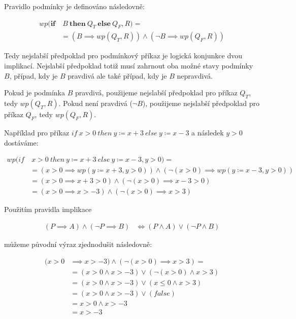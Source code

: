 Pravidlo podmínky je definováno následovně:

\begin{align*}
    wp(\textbf{if} & \ B \ \textbf{then} \ Q_T \ \textbf{else} \ Q_F, R) = \\
                   & = (B \implies wp(Q_T, R)) \land (\neg B \implies wp(Q_F, R))
\end{align*}

Tedy nejslabší předpoklad pro podmínkový příkaz je logická konjunkce dvou implikací.
Nejslabší předpoklad totiž musí zahrnout oba možné stavy podmínky $B$, případ, kdy je $B$ pravdivá ale také případ, kdy je $B$ nepravdivá.

Pokud je podmínka $B$ pravdivá, použijeme nejslabší předpoklad pro příkaz $Q_T$, tedy $wp(Q_T, R)$.
Pokud není pravdivá ($\neg B$), použijeme nejslabší předpoklad pro příkaz $Q_F$, tedy $wp(Q_F, R)$.

Například pro příkaz $if \ x > 0 \ then \ y \coloneqq x + 3 \ else \ y \coloneqq x - 3$
a následek $y > 0$ dostáváme:

\begin{align*}
    wp(if & \ x > 0 \ then \ y \coloneqq x + 3 \ else \ y \coloneqq x - 3, y > 0) = \\
          & = (x > 0 \implies wp(y \coloneqq x + 3, y > 0)) \land (\neg (x > 0) \implies wp(y \coloneqq x - 3, y > 0)) \\
          & = (x > 0 \implies x + 3 > 0) \land (\neg (x > 0) \implies x - 3 > 0) \\
          & = (x > 0 \implies x > -3) \land (\neg (x > 0) \implies x > 3)
\end{align*}

Použitím pravidla implikace

\begin{align*}
    (P \implies A) \land (\neg P \implies B) & \iff (P \land A) \lor (\neg P \land B)
\end{align*}

můžeme původní výraz zjednodušit následovně:

\begin{align*}
    (x > 0 & \implies x > -3) \land (\neg (x > 0) \implies x > 3) = \\
           & = (x > 0 \land x > -3) \lor (\neg (x > 0) \land x > 3) \\
           & = (x > 0 \land x > -3) \lor (x \leq 0 \land x > 3) \\
           & = (x > 0 \land x > -3) \lor (false) \\
           & = x > 0 \land x > -3 \\
           & = x > -3
\end{align*}

